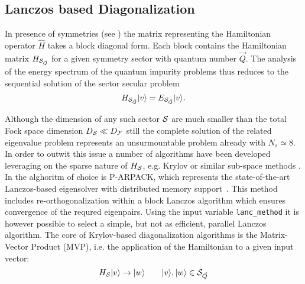 \documentclass[edipack2.tex]{subfiles}
\begin{document}

\subsection{Lanczos based Diagonalization}\label{sSecHam}
In presence of symmetries (see ) the matrix representing
the Hamiltonian operator $\hat{H}$ takes a block diagonal form. Each block
contains the Hamiltonian matrix $H_{{\cal S}_{\vec{Q}}}$ for a
given symmetry sector with quantum number $\vec{Q}$.
The analysis of the energy spectrum of the quantum impurity problems
thus reduces to the sequential solution of the sector secular problem
$$
H_{{\cal S}_{\vec{Q}}}|v\rangle=E_{{\cal S}_{\vec{Q}}}|v\rangle.
$$

Although the dimension of any such sector ${\cal S}$ are much smaller than the
total Fock space dimension $D_{\cal S} \ll D_{\cal F}$ still the complete solution of
the related eigenvalue problem represents an unsurmountable problem
already with $N_s\simeq 8$. 
In order to outwit this issue a number of
algorithms have been developed leveraging on the sparse nature of
$H_{\cal S}$, e.g. Krylov or similar sub-space methods \cite{Lanczos,Arnoldi,Feast}.   
In \NAME the alghoritm of choice is P-ARPACK, which represents the
state-of-the-art Lanczos-based eigensolver with distributed memory
support~\cite{P-Arpack}. This method includes re-orthogonalization
within a block Lanczos algorithm which ensures convergence of the
requred eigenpairs. Using the input variable {\tt lanc\_method} it is
however possible to select a simple, but not as efficient, parallel
Lanczos algorithm.
The core of Krylov-based diagonalization algorithms is the Matrix-Vector Product
(MVP), i.e. the application of the Hamiltonian to a given input
vector:
$$
H_{\cal S} |v\rangle \to |w\rangle\qquad |v\rangle,|w\rangle\in {\cal S}_{\vec{Q}}
$$
\end{document}
